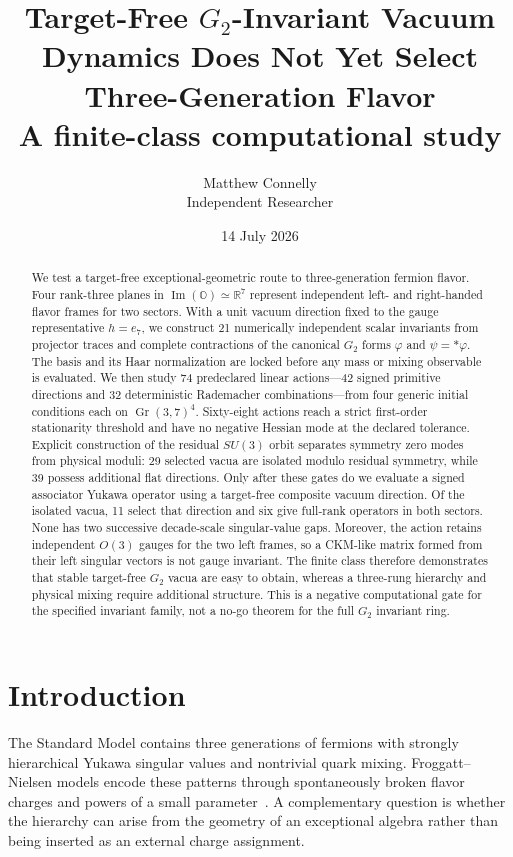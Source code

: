 \documentclass[11pt]{article}
\title{Target-Free $G_2$-Invariant Vacuum Dynamics Does Not Yet Select Three-Generation Flavor\\
\large A finite-class computational study}
\author{Matthew Connelly\\[2pt]\small Independent Researcher}
\date{14 July 2026}
\newcommand{\OO}{\mathbb O}
\newcommand{\RR}{\mathbb R}
\newcommand{\Gr}{\operatorname{Gr}}
\begin{document}
\maketitle

\begin{abstract}
We test a target-free exceptional-geometric route to three-generation fermion flavor.  Four rank-three planes in $\operatorname{Im}(\OO)\simeq\RR^7$ represent independent left- and right-handed flavor frames for two sectors.  With a unit vacuum direction fixed to the gauge representative $h=e_7$, we construct 21 numerically independent scalar invariants from projector traces and complete contractions of the canonical $G_2$ forms $\varphi$ and $\psi=*\varphi$.  The basis and its Haar normalization are locked before any mass or mixing observable is evaluated.  We then study 74 predeclared linear actions---42 signed primitive directions and 32 deterministic Rademacher combinations---from four generic initial conditions each on $\Gr(3,7)^4$.  Sixty-eight actions reach a strict first-order stationarity threshold and have no negative Hessian mode at the declared tolerance.  Explicit construction of the residual $SU(3)$ orbit separates symmetry zero modes from physical moduli: 29 selected vacua are isolated modulo residual symmetry, while 39 possess additional flat directions.  Only after these gates do we evaluate a signed associator Yukawa operator using a target-free composite vacuum direction.  Of the isolated vacua, 11 select that direction and six give full-rank operators in both sectors.  None has two successive decade-scale singular-value gaps.  Moreover, the action retains independent $O(3)$ gauges for the two left frames, so a CKM-like matrix formed from their left singular vectors is not gauge invariant.  The finite class therefore demonstrates that stable target-free $G_2$ vacua are easy to obtain, whereas a three-rung hierarchy and physical mixing require additional structure.  This is a negative computational gate for the specified invariant family, not a no-go theorem for the full $G_2$ invariant ring.
\end{abstract}

\section{Introduction}

The Standard Model contains three generations of fermions with strongly hierarchical Yukawa singular values and nontrivial quark mixing.  Froggatt--Nielsen models encode these patterns through spontaneously broken flavor charges and powers of a small parameter~\cite{FroggattNielsen1979}.  A complementary question is whether the hierarchy can arise from the geometry of an exceptional algebra rather than being inserted as an external charge assignment.
\end{document}

